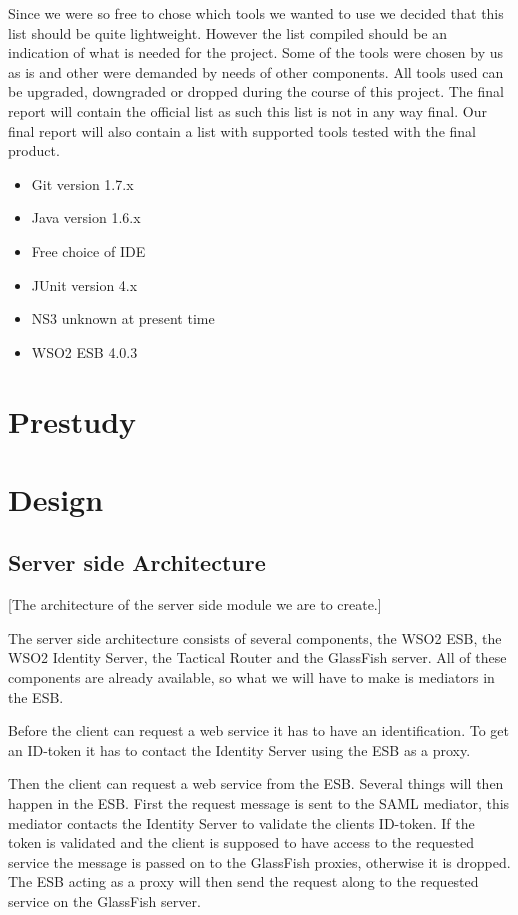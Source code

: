 \documentclass[12pt]{article}
\begin{document}
    Since we were so free to chose which tools we wanted to use we decided that this list should be quite lightweight. However the list compiled should be an indication of what is needed for the project. Some of the tools were chosen by us as is and other were demanded by needs of other components. All tools used can be  upgraded, downgraded or dropped during the course of this project. The final report will contain the official list as such this list is not in any way final. Our final report will also contain a list with supported tools tested with the final product.
    \begin{itemize}
        \item Git version 1.7.x
        \item Java version 1.6.x
        \item Free choice of IDE
        \item JUnit version 4.x
        \item NS3 unknown at present time
        \item WSO2 ESB 4.0.3
    \end{itemize}
\section{Prestudy}\label{prestudy}
\section{Design}\label{design}
    \subsection{Server side Architecture}\label{serversidearch} [The architecture of the server side module we are to create.] 
    
        The server side architecture consists of several components, the WSO2 ESB, the WSO2 Identity Server, the Tactical Router and the GlassFish server. All of these components are already available, so what we will have to make is mediators in the ESB.

        Before the client can request a web service it has to have an identification. To get an ID-token it has to contact the Identity Server using the ESB as a proxy.
        
        Then the client can request a web service from the ESB. Several things will then happen in the ESB. First the request message is sent to the SAML mediator, this mediator contacts the Identity Server to validate the clients ID-token. If the token is validated and the client is supposed to have access to the requested service the message is passed on to the GlassFish proxies, otherwise it is dropped. The ESB acting as a proxy will then send the request along to the requested service on the GlassFish server.
\end{document}
